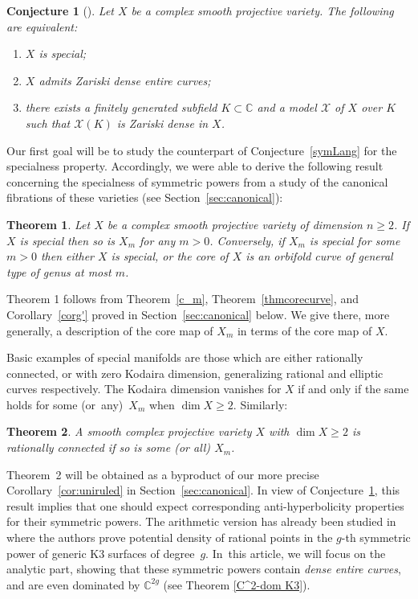\documentclass[JEP,XML,SOM,Unicode, NoEqCountersInSection,NoFloatCountersInSection,published]{cedram}
\let\mathcal\mathscr
\theoremstyle{theorem}
\newtheorem{theorem}{Theorem}
\newtheorem{conjecture}[proposition]{Conjecture}
\theoremstyle{definition}
\def\bC{{\mathbb C}}
\begin{document}
\begin{conjecture}[\cite{Cam04}] \label{conj:special}
Let \(X\) be a complex smooth projective variety. The following are equivalent:
\begin{enumerate}
\item \(X\) is \emph{special};
\item \(X\) admits Zariski dense entire curves;
\item there exists a finitely generated subfield \(K \subset \mathbb{C}\) and a model \(\mathcal{X}\) of \(X\) over \(K\) such that \(\mathcal{X}(K)\) is Zariski dense in \(X\).
\end{enumerate}
\end{conjecture}

Our first goal will be to study the counterpart of Conjecture~\ref{symLang} for the specialness property. Accordingly, we were able to derive the following result concerning the specialness of symmetric powers from a study of the canonical fibrations of these varieties (see Section~\ref{sec:canonical}):

\begin{theorem}\label{thm1}
Let $X$ be a complex smooth projective variety of dimension $n\geq 2$. If $X$ is special then so is $X_m$ for any $m>0$. Conversely, if $X_m$ is special for some $m>0$ then either $X$ is special, or the core of $X$ is an orbifold curve of general type of genus at most $m$.
\end{theorem}

Theorem 1 follows from Theorem~\ref{c_m}, Theorem~\ref{thmcorecurve}, and Corollary~\ref{corg'} proved in Section~\ref{sec:canonical} below. We give there, more generally, a description of the core map of $X_m$ in terms of the core map of $X$.

Basic examples of special manifolds are those which are either rationally connected, or with zero Kodaira dimension, generalizing rational and elliptic curves respec\-tively. The Kodaira dimension vanishes for $X$ if and only if the same holds for some (or~any)~$X_m$ when $\dim X\geq 2$. Similarly:

\begin{theorem}\label{thm2} A smooth complex projective variety $X$ with \(\dim X \geq 2\) is rationally connected if so is some (or all) $X_m$.
\end{theorem}

Theorem~2 will be obtained as a byproduct of our more precise Corollary~\ref{cor:uniruled} in Section~\ref{sec:canonical}. In view of Conjecture~\ref{conj:special}, this result implies that one should expect corresponding anti-hyperbolicity properties for their symmetric powers. The arithmetic version has already been studied in \cite{HT00} where the authors prove potential density of rational points in the $g$-th symmetric power of generic K3 surfaces of degree~$g$. In~this article, we will focus on the analytic part, showing that these symmetric powers contain \emph{dense entire curves}, and are even dominated by $\bC^{2g}$ (see Theorem \ref{C^2-dom K3}).
\end{document}
